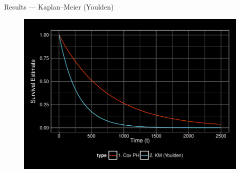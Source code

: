 \documentclass[12pt,t,handout]{beamer}
\begin{document}
\begin{frame}[c]{Results --- Kaplan--Meier (Youlden)}

\begin{center}
\begin{figure}[H]
\begin{center}
\includegraphics[width=\textwidth]{Figs/s1_cox_youlden.pdf}
\end{center}
\end{figure}
\end{center}

\note{
}

\end{frame}

\end{document}

